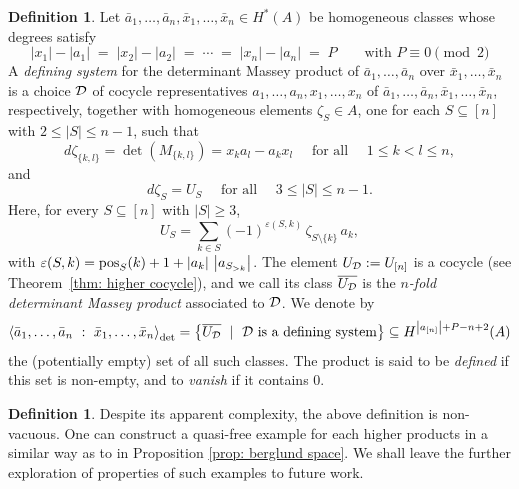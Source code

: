 \documentclass[11pt]{article}
\theoremstyle{definition}
\theoremstyle{definition}
\newtheorem{definition}[theorem]{Definition}
\begin{document}
\begin{definition}
\label{def: higher determinant Massey product}
Let $\bar a_1,\ldots,\bar a_n,\bar x_1,\ldots,\bar x_n\in H^*(A)$ be homogeneous classes
whose degrees satisfy
\begin{equation}
\label{ecu: higher degree condition}
|x_1|-|a_1|  \;=\; |x_2|-|a_2|  \;=\; \cdots  \;=\; |x_n|-|a_n| \;=\; P \qquad \mbox{with } P \equiv 0 \pmod{2}
\end{equation}
A \emph{defining system} for the determinant Massey product of
$\bar a_1,\ldots,\bar a_n$ over $\bar x_1,\ldots,\bar x_n$
is a choice $\mathcal D$ of cocycle representatives $a_1,\ldots,a_n,x_1,\ldots,x_n$ of
$\bar a_1,\ldots,\bar a_n,\bar x_1,\ldots,\bar x_n$, respectively,
together with homogeneous elements $\zeta_S\in A$, one for each $S\subseteq[n]$ with $2\leq |S|\leq n-1$, such that
\begin{equation*}
d\zeta_{\{k,l\}}=\det\left(M_{\{k,l\}}\right)= x_ka_l-a_kx_l \quad \textrm{ for all } \quad 1\leq k<l\leq n,
\end{equation*}
and
\begin{equation*}
d\zeta_S=U_S \quad \textrm{ for all } \quad 3\leq |S|\leq n-1.
\end{equation*}
Here, for every $S\subseteq[n]$ with $|S|\geq 3$,
\begin{equation}
\label{ecu: higher U}
U_S=\sum_{k\in S}(-1)^{\varepsilon(S,k)}\,\zeta_{S\setminus\{k\}}\,a_k,
\end{equation}
with $\varepsilon(S,k)=\operatorname{\mathrm{pos}}_S(k)+1+\left|a_k\right|\,\left|a_{S_{>k}}\right|$.
The element $U_{\mathcal D}:=U_{[n]}$ is a cocycle (see Theorem~\ref{thm: higher cocycle}), and we call its class
$\overline{U_{\mathcal D}}$ is the \emph{$n$-fold determinant Massey product} associated to $\mathcal D$.
We denote by
\begin{equation*}
\left\langle \bar a_1,\ldots,\bar a_n\ :\ \bar x_1,\ldots,\bar x_n\right\rangle_{\det}
=\left\{\overline{U_{\mathcal D}} \ \mid\ \mathcal D \text{ is a defining system}\right\}
\subseteq H^{\left |a_{[n]}\right|+P-n+2}(A)
\end{equation*}
the (potentially empty) set of all such classes.
The product is said to be \emph{defined} if this set is non-empty, and to \emph{vanish} if it contains $0$.

\end{definition}
\begin{definition}
    Despite its apparent complexity, the above definition is non-vacuous. One can construct a quasi-free example for each higher products in a similar way as to in Proposition \ref{prop: berglund space}.
    We shall leave the further exploration of properties of such examples to future work.
\end{definition}
\end{document}
